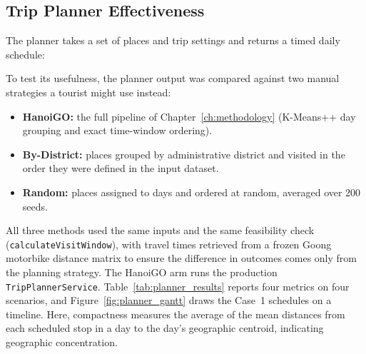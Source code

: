 \documentclass[a4paper,12pt]{report}
\begin{document}
\subsection{Trip Planner Effectiveness}

The planner takes a set of places and trip settings and returns a timed daily schedule:

\begin{center}
\end{center}

To test its usefulness, the planner output was compared against two manual strategies a tourist might use instead:

\begin{itemize}
    \item \textbf{HanoiGO:} the full pipeline of Chapter~\ref{ch:methodology} (K-Means++ day grouping and exact time-window ordering).
    \item \textbf{By-District:} places grouped by administrative district and visited in the order they were defined in the input dataset.
    \item \textbf{Random:} places assigned to days and ordered at random, averaged over 200 seeds.
\end{itemize}

All three methods used the same inputs and the same feasibility check (\texttt{calculateVisitWindow}), with travel times retrieved from a frozen Goong motorbike distance matrix to ensure the difference in outcomes comes only from the planning strategy. The HanoiGO arm runs the production \texttt{TripPlannerService}. Table~\ref{tab:planner_results} reports four metrics on four scenarios, and Figure~\ref{fig:planner_gantt} draws the Case~1 schedules on a timeline. Here, compactness measures the average of the mean distances from each scheduled stop in a day to the day's geographic centroid, indicating geographic concentration.
\end{document}
